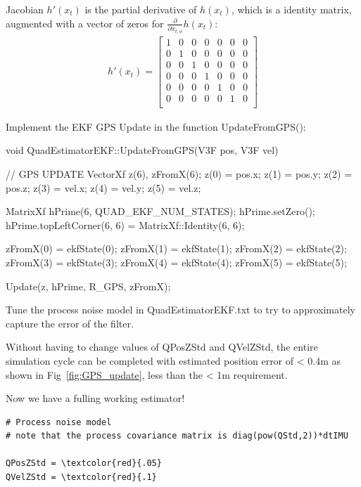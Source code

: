 \documentclass[letterpaper]{article}
\begin{document}
Jacobian $h'(x_t)$ is the partial derivative of $h(x_t)$, which is a identity matrix, augmented with a vector of zeros for $\frac{\partial}{\partial x_{t,\phi}} h(x_t)$: 
\begin{align*}
  h'(x_t) = \left[\begin{array}{ccccccc}
      1&0&0&0&0&0&0\\
      0&1&0&0&0&0&0\\
      0&0&1&0&0&0&0\\
      0&0&0&1&0&0&0\\
      0&0&0&0&1&0&0\\
      0&0&0&0&0&1&0\\                  
      \end{array}\right]
\end{align*}

Implement the EKF GPS Update in the function UpdateFromGPS():
\begin{CPP}
void QuadEstimatorEKF::UpdateFromGPS(V3F pos, V3F vel)
{
    // GPS UPDATE
    VectorXf z(6), zFromX(6);
    z(0) = pos.x;
    z(1) = pos.y;
    z(2) = pos.z;
    z(3) = vel.x;
    z(4) = vel.y;
    z(5) = vel.z;

    MatrixXf hPrime(6, QUAD_EKF_NUM_STATES);
    hPrime.setZero();
    hPrime.topLeftCorner(6, 6) = MatrixXf::Identity(6, 6);

    zFromX(0) = ekfState(0);
    zFromX(1) = ekfState(1);
    zFromX(2) = ekfState(2);
    zFromX(3) = ekfState(3);
    zFromX(4) = ekfState(4);
    zFromX(5) = ekfState(5);

    Update(z, hPrime, R_GPS, zFromX);
}
\end{CPP}

Tune the process noise model in QuadEstimatorEKF.txt to try to approximately capture the error of the filter. 

Without having to change values of QPosZStd and QVelZStd, the entire simulation cycle can be completed with estimated position error of < 0.4m as shown in Fig~\ref{fig:GPS_update}, less than the < 1m requirement.

Now we have a fulling working estimator!

\newpage

\begin{Verbatim}[frame=single, commandchars=\\\{\}]
# Process noise model
# note that the process covariance matrix is diag(pow(QStd,2))*dtIMU

QPosZStd = \textcolor{red}{.05}
QVelZStd = \textcolor{red}{.1}
\end{Verbatim}
\end{document}
